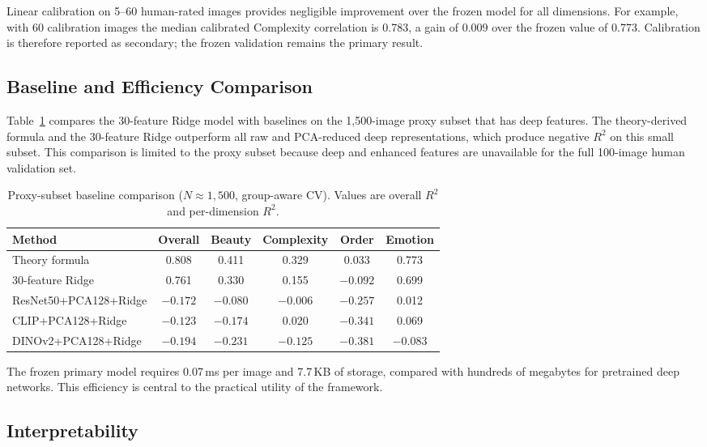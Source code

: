 Linear calibration on 5--60 human-rated images provides negligible improvement over the frozen model for all dimensions. For example, with 60 calibration images the median calibrated Complexity correlation is 0.783, a gain of 0.009 over the frozen value of 0.773. Calibration is therefore reported as secondary; the frozen validation remains the primary result.

\subsection{Baseline and Efficiency Comparison}

Table~\ref{tab:baselines} compares the 30-feature Ridge model with baselines on the 1,500-image proxy subset that has deep features. The theory-derived formula and the 30-feature Ridge outperform all raw and PCA-reduced deep representations, which produce negative $R^2$ on this small subset. This comparison is limited to the proxy subset because deep and enhanced features are unavailable for the full 100-image human validation set.

\begin{table}[htbp]
\centering
\caption{Proxy-subset baseline comparison ($N \approx 1{,}500$, group-aware CV). Values are overall $R^2$ and per-dimension $R^2$.}
\label{tab:baselines}
\begin{tabular}{@{}lccccc@{}}
\toprule
Method & Overall & Beauty & Complexity & Order & Emotion \\
\midrule
Theory formula & 0.808 & 0.411 & 0.329 & 0.033 & 0.773 \\
30-feature Ridge & 0.761 & 0.330 & 0.155 & $-0.092$ & 0.699 \\
ResNet50+PCA128+Ridge & $-0.172$ & $-0.080$ & $-0.006$ & $-0.257$ & 0.012 \\
CLIP+PCA128+Ridge & $-0.123$ & $-0.174$ & 0.020 & $-0.341$ & 0.069 \\
DINOv2+PCA128+Ridge & $-0.194$ & $-0.231$ & $-0.125$ & $-0.381$ & $-0.083$ \\
\bottomrule
\end{tabular}
\end{table}

The frozen primary model requires 0.07\,ms per image and 7.7\,KB of storage, compared with hundreds of megabytes for pretrained deep networks. This efficiency is central to the practical utility of the framework.

\subsection{Interpretability}

